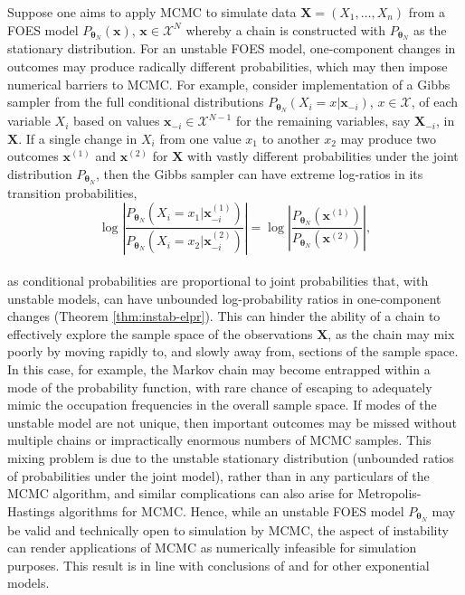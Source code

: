 \documentclass[numbib]{imamat}
\theoremstyle{theorem}
\theoremstyle{lemma}
\theoremstyle{example}
\theoremstyle{corollary}
\theoremstyle{definition}
\theoremstyle{remark}
\theoremstyle{approximation}
\theoremstyle{scheme}
\begin{document}
Suppose one aims to apply MCMC to simulate data
\(\boldsymbol X=(X_1,\ldots,X_n)\) from a FOES model
\(P_{\boldsymbol \theta_N}(\boldsymbol x)\),
\(\boldsymbol x \in\mathcal{X}^N\) whereby a chain is constructed with
\(P_{\boldsymbol \theta_N}\) as the stationary distribution. For an
unstable FOES model, one-component changes in outcomes may produce
radically different probabilities, which may then impose numerical
barriers to MCMC. For example, consider implementation of a Gibbs
sampler from the full conditional distributions
\(P_{\boldsymbol \theta_N} (X_i = x| \boldsymbol x_{-i})\),
\(x\in\mathcal{X}\), of each variable \(X_i\) based on values
\(\boldsymbol x_{-i}\in \mathcal{X}^{N-1}\) for the remaining variables,
say \(\boldsymbol X_{-i}\), in \(\boldsymbol X\). If a single change in
\(X_i\) from one value \(x_1\) to another \(x_2\) may produce two
outcomes \(\boldsymbol x^{(1)}\) and \(\boldsymbol x^{(2)}\) for
\(\boldsymbol X\) with vastly different probabilities under the joint
distribution \(P_{\boldsymbol \theta_N}\), then the Gibbs sampler can
have extreme log-ratios in its transition probabilities, \[
\log \left| \frac{P_{\boldsymbol \theta_N} (X_i =x_1 | \boldsymbol x^{(1)}_{-i})}{P_{\boldsymbol \theta_N} (X_i = x_2| \boldsymbol x^{(2)}_{-i}) } \right|=\log \left| \frac{P_{\boldsymbol \theta_N} ( \boldsymbol x^{(1)} )}{P_{\boldsymbol \theta_N} (  \boldsymbol x^{(2)} ) } \right|,
\]\\
as conditional probabilities are proportional to joint probabilities
that, with unstable models, can have unbounded log-probability ratios in
one-component changes (Theorem \ref{thm:instab-elpr}). This can hinder
the ability of a chain to effectively explore the sample space of the
observations \(\boldsymbol X\), as the chain may mix poorly by moving
rapidly to, and slowly away from, sections of the sample space. In this
case, for example, the Markov chain may become entrapped within a mode
of the probability function, with rare chance of escaping to adequately
mimic the occupation frequencies in the overall sample space. If modes
of the unstable model are not unique, then important outcomes may be
missed without multiple chains or impractically enormous numbers of MCMC
samples. This mixing problem is due to the unstable stationary
distribution (unbounded ratios of probabilities under the joint model),
rather than in any particulars of the MCMC algorithm, and similar
complications can also arise for Metropolis-Hastings algorithms for
MCMC. Hence, while an unstable FOES model \(P_{\boldsymbol \theta_N}\)
may be valid and technically open to simulation by MCMC, the aspect of
instability can render applications of MCMC as numerically infeasible
for simulation purposes. This result is in line with conclusions of
\citet{handcock2003assessing} and \citet{schweinberger2011instability}
for other exponential models.
\end{document}
